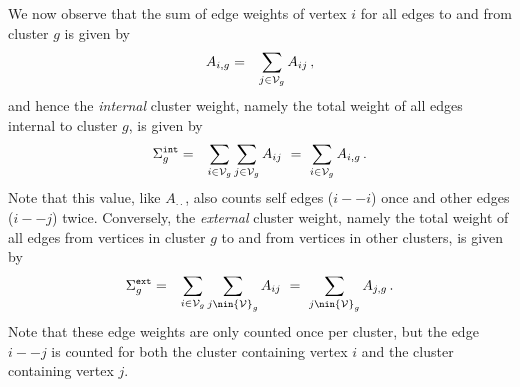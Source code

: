 \documentclass[a4paper]{article}
\begin{document}
We now observe that the sum of edge weights of vertex $i$ for all edges to and from cluster $g$
is given by
\begin{eqnarray}
  A_{i,g} & = & \sum_{j\in{\cal V}_g} A_{ij}\,,
\end{eqnarray}
and hence the {\em internal} cluster weight, namely the total weight of all edges internal to 
cluster $g$, is given by
\begin{eqnarray}
   \Sigma_g^{\tt int} & = & \sum_{i\in{\cal V}_g}\sum_{j\in{\cal V}_g} A_{ij}
   ~=~\sum_{i\in{\cal V}_g} A_{i,g}\,.
\label{eq:sig:int}
\end{eqnarray}
Note that this value, like $A_{\cdot\cdot}$, also counts self edges ($i -- i$) once and other edges 
($i -- j$) twice.
Conversely, the {\em external} cluster weight, namely the total weight of all edges from vertices
in cluster $g$ to and from vertices in other clusters, is given by
\begin{eqnarray}
   \Sigma_g^{\tt ext} & = & \sum_{i\in{\cal V}_g}\sum_{j\nin{\cal V}_g} A_{ij}
   ~=~\sum_{j\nin{\cal V}_g} A_{j,g}\,.
\end{eqnarray}
Note that these edge weights are only counted once per cluster, but the edge $i -- j$ is 
counted for both the cluster containing vertex $i$ and the cluster containing vertex $j$.
\end{document}
